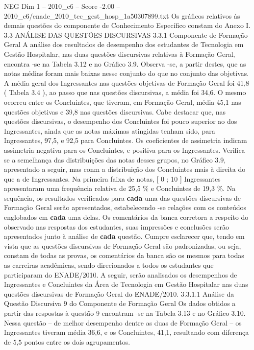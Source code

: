 \begin{textsample}{NEG Dim 1 – 2010\_c6 – Score -2.00 – 2010\_c6/enade\_2010\_tec\_gest\_hosp\_1a50307899.txt}
Os gráficos relativos às demais questões do componente de Conhecimento Específico constam do Anexo I. 3.3 ANÁLISE DAS QUESTÕES DISCURSIVAS 3.3.1 Componente de Formação Geral A análise dos resultados de desempenho dos estudantes de Tecnologia em Gestão Hospitalar, nas duas questões discursivas relativas à Formação Geral, encontra -se na Tabela 3.12 e no Gráfico 3.9.
Observa -se, a partir destes, que as notas médias foram mais baixas nesse conjunto do que no conjunto das objetivas.
A média geral dos Ingressantes nas questões objetivas de Formação Geral foi 41,8 ( Tabela 3.4 ), ao passo que nas questões discursivas, a média foi 34,6.
O mesmo ocorreu entre os Concluintes, que tiveram, em Formação Geral, média 45,1 nas questões objetivas e 39,8 nas questões discursivas.
Cabe destacar que, nas questões discursivas, o desempenho dos Concluintes foi pouco superior ao dos Ingressantes, ainda que as notas máximas atingidas tenham sido, para Ingressantes, 97,5, e 92,5 para Concluintes.
Os coeficientes de assimetria indicam assimetria negativa para os Concluintes, e positiva para os Ingressantes.
Verifica -se a semelhança das distribuições das notas desses grupos, no Gráfico 3.9, apresentado a seguir, mas conm a distribuição dos Concluintes mais à direita do que a de Ingressantes.
Na primeira faixa de notas, [ 0 ; 10 ] Ingressantes apresentaram uma frequência relativa de 25,5 \% e Concluintes de 19,3 \%.
Na sequência, os resultados verificados para \textbf{cada} uma das questões discursivas de Formação Geral serão apresentados, estabelecendo -se relações com os conteúdos englobados em \textbf{cada} uma delas.
Os comentários da banca corretora a respeito do observado nas respostas dos estudantes, suas impressões e conclusões serão apresentados junto à análise de \textbf{cada} questão.
Cumpre esclarecer que, tendo em vista que as questões discursivas de Formação Geral são padronizadas, ou seja, constam de todas as provas, os comentários da banca são os mesmos para todas as carreiras acadêmicas, sendo direcionados a todos os estudantes que participaram do ENADE/2010.
A seguir, serão analisados os desempenhos de Ingressantes e Concluintes da Área de Tecnologia em Gestão Hospitalar nas duas questões discursivas de Formação Geral do ENADE/2010. 3.3.1.1 Análise da Questão Discursiva 9 do Componente de Formação Geral Os dados obtidos a partir das respostas à questão 9 encontram -se na Tabela 3.13 e no Gráfico 3.10.
Nessa questão – de melhor desempenho dentre as duas de Formação Geral – os Ingressantes tiveram média 36,6, e os Concluintes, 41,1, resultando com diferença de 5,5 pontos entre os dois agrupamentos.

\end{textsample}
